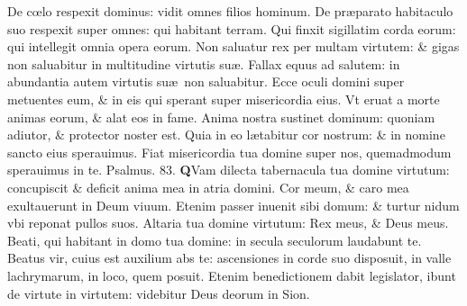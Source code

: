 \documentclass[a5paper,10pt]{book}
\def\ae{æ}
\def\oe{œ}
\begin{document}
\begin{multicols*}{2}
\newline \color{red} D\color{black}e c\oe lo respexit dominus: vidit omnes filios hominum.
\newline \color{red} D\color{black}e pr\ae parato habitaculo suo respexit super omnes: qui habitant terram.
\newline \color{red} Q\color{black}ui finxit sigillatim corda eorum: qui intellegit omnia opera eorum.
\newline \color{red} N\color{black}on saluatur rex per multam virtutem: \& gigas non saluabitur in multitudine virtutis su\ae .
\newline \color{red} F\color{black}allax equus ad salutem: in abundantia autem virtutis su\ae \ non saluabitur.
\newline \color{red} E\color{black}cce oculi domini super metuentes eum, \& in eis qui sperant super misericordia eius.
\newline \color{red} V\color{black}t eruat a morte animas eorum, \& alat eos in fame.
\newline \color{red} A\color{black}nima nostra sustinet dominum: quoniam adiutor, \& protector noster est.
\newline \color{red} Q\color{black}uia in eo l\ae tabitur cor nostrum: \& in nomine sancto eius sperauimus.
\newline \color{red} F\color{black}iat misericordia tua domine super nos, quemadmodum sperauimus in te.
\newline \color{red} Psalmus. \hypertarget{ps83}{83.} \color{black}
\vspace{-.5em}
\lettrine[lines=2]{\bfseries \color{red} Q}{}Vam dilecta tabernacula tua domine virtutum: concupiscit \& deficit anima mea in atria domini.
\newline \color{red} C\color{black}or meum, \& caro mea exultauerunt in Deum viuum.
\newline \color{red} E\color{black}tenim passer inuenit sibi domum: \& turtur nidum vbi reponat pullos suos.%
\newline \color{red} A\color{black}ltaria tua domine virtutum: Rex meus, \& Deus meus.
\newline \color{red} B\color{black}eati, qui habitant in domo tua domine: in secula seculorum laudabunt te.
\newline \color{red} B\color{black}eatus vir, cuius est auxilium abs te: ascensiones in corde suo disposuit, in valle lachrymarum, in loco, quem posuit.
\newline \color{red} E\color{black}tenim benedictionem dabit legislator, ibunt de virtute in virtutem: videbitur Deus deorum in Sion.

\end{multicols*}
\end{document}
